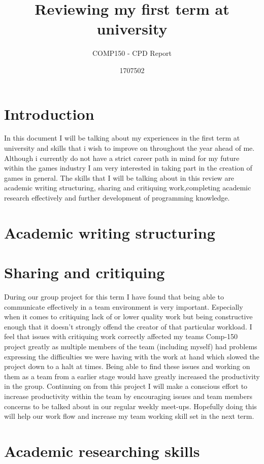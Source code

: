 \documentclass{scrartcl}
\title{Reviewing my first term at university}
\subtitle{COMP150 - CPD Report}
\author{1707502}
\begin{document}
\maketitle

\section{Introduction}
In this document I will be talking about my experiences in the first term at university and skills that i wish to improve on throughout the year ahead of me.
Although i currently do not have a strict career path in mind for my future within the games industry I am very interested in taking part in the creation of games in general. The skills that I will be talking about in this review are academic writing structuring, sharing and critiquing work,completing academic research effectively and further development of programming knowledge.   

\section{Academic writing structuring}



\section{Sharing and critiquing}

During our group project for this term I have found that being able to communicate effectively in a team environment is very important. Especially when it comes to critiquing lack of or lower quality work but being constructive enough that it doesn't strongly offend the creator of that particular workload. I feel that issues with critiquing work correctly affected my teams Comp-150 project greatly as multiple members of the team (including myself) had problems expressing the difficulties we were having with the work at hand which slowed the project down to a halt at times. Being able to find these issues and working on them as a team from a earlier stage would have greatly increased the productivity in the group. Continuing on from this project I will make a conscious effort to increase productivity within the team by encouraging issues and team members concerns to be talked about in our regular weekly meet-ups. Hopefully doing this will help our work flow and increase my team working skill set in the next term. 

\section{Academic researching skills}
\end{document}
